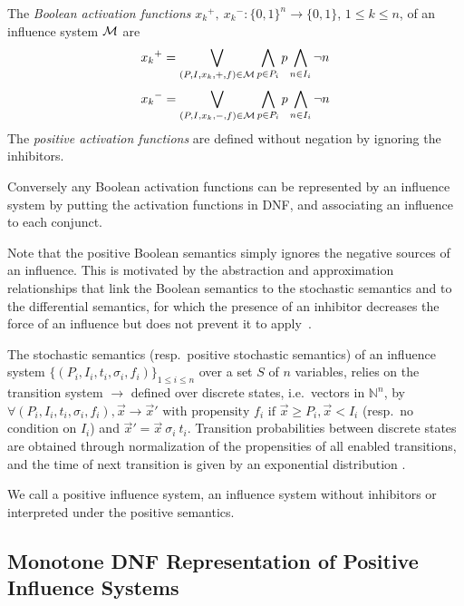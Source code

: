 \documentclass{llncs}
\newcommand{\lra}{\longrightarrow}
\begin{document}
\begin{definition}\label{def:activation}
The \emph{Boolean activation functions} ${x_k}^+,\ {x_k}^-:{\{0,1\}}^n \rightarrow\{0,1\}$, $1 \leq k \leq n$,
of an influence system $\cal M$ are
$${x_k}^+=\bigvee_{(P,I,x_k,+,f)\in\cal M} \bigwedge_{p\in P_i} p\bigwedge_{n\in I_i} \neg n$$
$${x_k}^-=\bigvee_{(P,I,x_k,-,f)\in\cal M} \bigwedge_{p\in P_i} p\bigwedge_{n\in I_i} \neg n$$
The \emph{positive activation functions} are defined without negation by ignoring the inhibitors.
\end{definition}

Conversely any Boolean activation functions can be represented by an influence system
by putting the activation functions in DNF, and associating an influence to each conjunct.

Note that the positive Boolean semantics simply ignores the negative sources of an influence.
This is motivated by the abstraction and approximation relationships that link the Boolean semantics
to the stochastic semantics and to the differential semantics, for which the presence of an inhibitor decreases the force of an influence but does not prevent it to apply~\cite{FMRS16cmsb}.


\begin{definition}\label{def:stoch}
   The stochastic semantics (resp.~positive stochastic semantics) of an influence system $\{(P_i, I_i, t_i,
   \sigma_i, f_i)\}_{1\leq i\leq n}$ over a set $S$ of $n$ variables, relies
   on the transition system $\lra$ defined over discrete states, i.e.\
   vectors in $\mathbb{N}^n$, by $\forall (P_i, I_i, t_i, \sigma_i, f_i), {\vec
   x}\lra{\vec x'} \text{ with propensity }f_i\text{ if }{\vec x}\geq P_i,
   {\vec x}<I_i$ (resp.~no condition on $I_i$) and ${\vec x'} = {\vec x}\  \sigma_i\ t_i$.
   Transition probabilities between discrete states are obtained through
   normalization of the propensities of all enabled transitions, and the time
   of next transition is given by an exponential distribution \cite{Gillespie77jpc}.
\end{definition}

We call a positive influence system, an influence system without inhibitors or interpreted under the positive semantics.

\subsection{Monotone DNF Representation of Positive Influence Systems}
\end{document}
